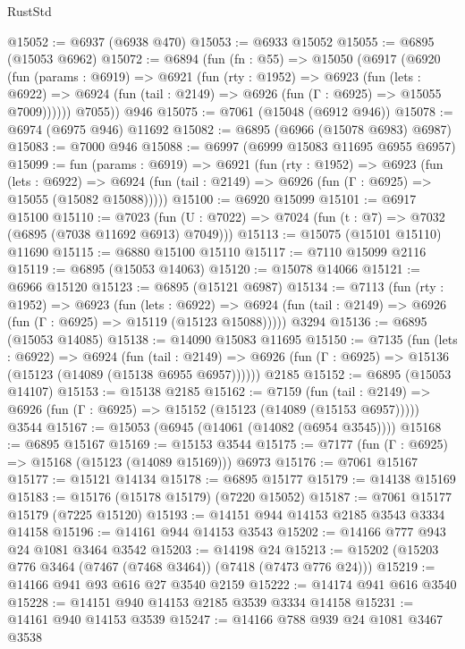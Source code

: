 \begin{lexlean}{RustStd}
\begin{coremodule}
@15052 := @6937 (@6938 @470)
@15053 := @6933 @15052
@15055 := @6895 (@15053 @6962)
@15072 := @6894
    (fun (fn : @55) =>
    @15050
      (@6917
        (@6920
          (fun (params : @6919) =>
          @6921
            (fun (rty : @1952) =>
            @6923
              (fun (lets : @6922) =>
              @6924 (fun (tail : @2149) => @6926 (fun (Γ : @6925) => @15055 @7009))))))
        @7055))
    @946
@15075 := @7061 (@15048 (@6912 @946))
@15078 := @6974 (@6975 @946) @11692
@15082 := @6895 (@6966 (@15078 @6983) @6987)
@15083 := @7000 @946
@15088 := @6997 (@6999 @15083 @11695 @6955 @6957)
@15099 := fun (params : @6919) =>
  @6921
    (fun (rty : @1952) =>
    @6923
      (fun (lets : @6922) =>
      @6924 (fun (tail : @2149) => @6926 (fun (Γ : @6925) => @15055 (@15082 @15088)))))
@15100 := @6920 @15099
@15101 := @6917 @15100
@15110 := @7023
    (fun (U : @7022) => @7024 (fun (t : @7) => @7032 (@6895 (@7038 @11692 @6913) @7049)))
@15113 := @15075 (@15101 @15110) @11690
@15115 := @6880 @15100 @15110
@15117 := @7110 @15099 @2116
@15119 := @6895 (@15053 @14063)
@15120 := @15078 @14066
@15121 := @6966 @15120
@15123 := @6895 (@15121 @6987)
@15134 := @7113
    (fun (rty : @1952) =>
    @6923
      (fun (lets : @6922) =>
      @6924 (fun (tail : @2149) => @6926 (fun (Γ : @6925) => @15119 (@15123 @15088)))))
    @3294
@15136 := @6895 (@15053 @14085)
@15138 := @14090 @15083 @11695
@15150 := @7135
    (fun (lets : @6922) =>
    @6924
      (fun (tail : @2149) =>
      @6926 (fun (Γ : @6925) => @15136 (@15123 (@14089 (@15138 @6955 @6957))))))
    @2185
@15152 := @6895 (@15053 @14107)
@15153 := @15138 @2185
@15162 := @7159
    (fun (tail : @2149) => @6926 (fun (Γ : @6925) => @15152 (@15123 (@14089 (@15153 @6957)))))
    @3544
@15167 := @15053 (@6945 (@14061 (@14082 (@6954 @3545))))
@15168 := @6895 @15167
@15169 := @15153 @3544
@15175 := @7177 (fun (Γ : @6925) => @15168 (@15123 (@14089 @15169))) @6973
@15176 := @7061 @15167
@15177 := @15121 @14134
@15178 := @6895 @15177
@15179 := @14138 @15169
@15183 := @15176 (@15178 @15179) (@7220 @15052)
@15187 := @7061 @15177 @15179 (@7225 @15120)
@15193 := @14151 @944 @14153 @2185 @3543 @3334 @14158
@15196 := @14161 @944 @14153 @3543
@15202 := @14166 @777 @943 @24 @1081 @3464 @3542
@15203 := @14198 @24
@15213 := @15202 (@15203 @776 @3464 (@7467 (@7468 @3464)) (@7418 (@7473 @776 @24)))
@15219 := @14166 @941 @93 @616 @27 @3540 @2159
@15222 := @14174 @941 @616 @3540
@15228 := @14151 @940 @14153 @2185 @3539 @3334 @14158
@15231 := @14161 @940 @14153 @3539
@15247 := @14166
    @788
    @939
    @24
    @1081
    @3467
    @3538

\end{coremodule}
\end{lexlean}
